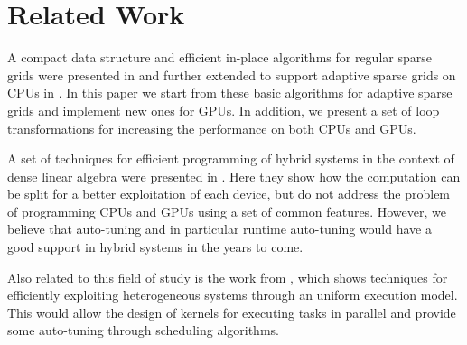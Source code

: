 \section{Related Work}
A compact data structure and efficient in-place algorithms for regular sparse
grids were presented in \cite{Murarasu:2011:CDS:1941553.1941559} and further extended to support
adaptive sparse grids on CPUs in \cite{murarasu12fastsg:}. In this paper we start
from these basic algorithms for adaptive sparse grids and implement new ones for
GPUs. In addition, we present a set of loop transformations for increasing
the performance on both CPUs and GPUs.

A set of techniques for efficient programming of hybrid systems in the context
of dense linear algebra were presented in \cite{Tomov:2010:TDL:1805333.1805388}.
Here they show how the computation can be split for a better exploitation of
each device, but do not address the problem of programming CPUs and GPUs using a
set of common features. However, we believe that auto-tuning and in particular
runtime auto-tuning would have a good support in hybrid systems in the years to
come.

Also related to this field of study is the work from
\cite{Augonnet:2011:SUP:1951453.1951454}, which shows techniques for efficiently
exploiting heterogeneous systems through an uniform execution model. This would
allow the design of kernels for executing tasks in parallel and provide some
auto-tuning through scheduling algorithms.
